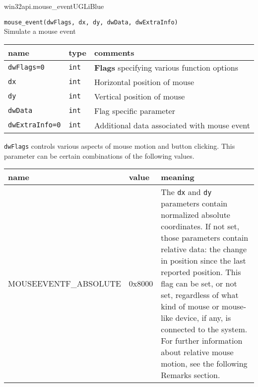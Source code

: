 \documentclass[a4paper,10pt,cours,firamath]{nsi}
\begin{document}
\begin{encadrecolore}{win32api.mouse\_event}{UGLiBlue}
	
	\texttt{mouse\_event(dwFlags, dx, dy, dwData, dwExtraInfo)}\\
	
	Simulate a mouse event\\
	
	
	\begin{center}
		\begin{tabularx}{\textwidth}{|X|X|X|}
			\hline\rowcolor{UGLiBlue}
			\color{white}\textbf{name } & \color{white}\textbf{type} & \color{white}\textbf{comments}                     \\
			\hline
			\texttt{dwFlags=0}          & \texttt{int}               & \textbf{Flags} specifying various function options \\
			\hline
			\texttt{dx}                 & \texttt{int}               & Horizontal position of mouse                       \\
			\hline
			\texttt{dy}                 & \texttt{int}               & Vertical position of mouse                         \\
			\hline
			\texttt{dwData}             & \texttt{int}               & Flag specific parameter                            \\
			\hline
			\texttt{dwExtraInfo=0}      & \texttt{int}               & Additional data associated with mouse event        \\
			\hline
		\end{tabularx}
	\end{center}
	\texttt{dwFlags} controls various aspects of mouse motion and button clicking. This parameter can be certain combinations of the following values.
	\begin{center}
		\scriptsize
		\begin{tabularx}{\textwidth}{|X|X|X|}
			\hline\rowcolor{UGLiBlue}
			\color{white}\textbf{name } & \color{white}\textbf{value} & \color{white}\textbf{meaning}                                                                                                                                                                                                                                                                                                                                                                                         \\
			\hline
			MOUSEEVENTF\_ABSOLUTE       & 0x8000                      & The \texttt{dx} and \texttt{dy} parameters contain normalized absolute coordinates. If not set, those parameters contain relative data: the change in position since the last reported position. This flag can be set, or not set, regardless of what kind of mouse or mouse-like device, if any, is connected to the system. For further information about relative mouse motion, see the following Remarks section. \\

\end{tabularx}
\end{center}
\end{encadrecolore}
\end{document}
